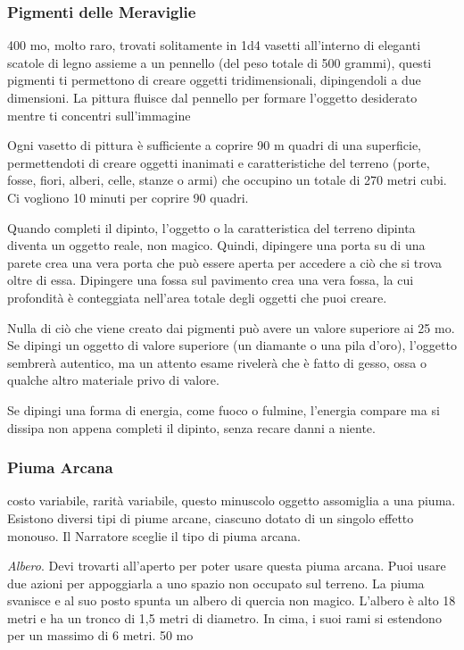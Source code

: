 \begin{multicols}{2}
	\subsubsection*{Pigmenti delle Meraviglie}
	400 mo, molto raro, trovati solitamente in 1d4 vasetti all'interno di eleganti scatole di legno assieme a un pennello (del peso totale di 500 grammi), questi pigmenti ti permettono di creare oggetti tridimensionali, dipingendoli a due dimensioni. La pittura fluisce dal pennello per formare l'oggetto desiderato mentre ti concentri sull'immagine

	Ogni vasetto di pittura è sufficiente a coprire 90 m quadri di una superficie, permettendoti di creare oggetti inanimati e caratteristiche del terreno (porte, fosse, fiori, alberi, celle, stanze o armi) che occupino un totale di 270 metri cubi. Ci vogliono 10 minuti per coprire 90 quadri.

	Quando completi il dipinto, l'oggetto o la caratteristica del terreno dipinta diventa un oggetto reale, non magico. Quindi, dipingere una porta su di una parete crea una vera porta che può essere aperta per accedere a ciò che si trova oltre di essa. Dipingere una fossa sul pavimento crea una vera fossa, la cui profondità è conteggiata nell'area totale degli oggetti che puoi creare.

	Nulla di ciò che viene creato dai pigmenti può avere un valore superiore ai 25 mo. Se dipingi un oggetto di valore superiore (un diamante o una pila d'oro), l'oggetto sembrerà autentico, ma un attento esame rivelerà che è fatto di gesso, ossa o qualche altro materiale privo di valore.

	Se dipingi una forma di energia, come fuoco o fulmine, l'energia compare ma si dissipa non appena completi il dipinto, senza recare danni a niente.

	\subsubsection*{Piuma Arcana}
	costo variabile, rarità variabile, questo minuscolo oggetto assomiglia a una piuma. Esistono diversi tipi di piume arcane, ciascuno dotato di un singolo effetto monouso. Il Narratore sceglie il tipo di piuma arcana.

	\textit{Albero}. Devi trovarti all'aperto per poter usare questa piuma arcana. Puoi usare due azioni per appoggiarla a uno spazio non occupato sul terreno. La piuma svanisce e al suo posto spunta un albero di quercia non magico. L'albero è alto 18 metri e ha un tronco di 1,5 metri di diametro. In cima, i suoi rami si estendono per un massimo di 6 metri. 50 mo


\end{multicols}
